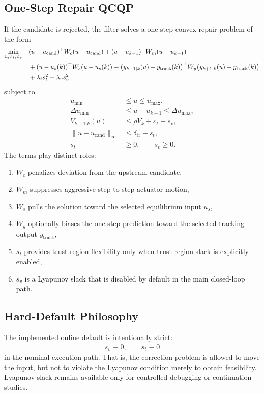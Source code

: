 \documentclass[11pt]{article}
\begin{document}
\subsection{One-Step Repair QCQP}
If the candidate is rejected, the filter solves a one-step convex repair problem of the form
\begin{align}
\min_{u,\,s_t,\,s_v}\quad
& (u-u_{\mathrm{cand}})^\top W_c (u-u_{\mathrm{cand}})
+ (u-u_{k-1})^\top W_m (u-u_{k-1}) \notag\\
& + (u-u_s(k))^\top W_s (u-u_s(k))
+ \big(y_{k+1|k}(u)-y_{\mathrm{track}}(k)\big)^\top W_y \big(y_{k+1|k}(u)-y_{\mathrm{track}}(k)\big) \notag\\
& + \lambda_t s_t^2 + \lambda_v s_v^2, \label{eq:qcqp_obj}
\end{align}
subject to
\begin{align}
u_{\min} &\le u \le u_{\max}, \label{eq:qcqp_ubounds}\\
\Delta u_{\min} &\le u-u_{k-1} \le \Delta u_{\max}, \label{eq:qcqp_dubounds}\\
V_{k+1|k}(u) &\le \rho V_k + \varepsilon_{\ell} + s_v, \label{eq:qcqp_lyap}\\
\lVert u-u_{\mathrm{cand}}\rVert_{\infty} &\le \delta_{\mathrm{tr}} + s_t, \label{eq:qcqp_trust}\\
s_t &\ge 0,\qquad s_v \ge 0. \label{eq:qcqp_slacks}
\end{align}
The terms play distinct roles:
\begin{enumerate}[leftmargin=*]
\item $W_c$ penalizes deviation from the upstream candidate,
\item $W_m$ suppresses aggressive step-to-step actuator motion,
\item $W_s$ pulls the solution toward the selected equilibrium input $u_s$,
\item $W_y$ optionally biases the one-step prediction toward the selected tracking output $y_{\mathrm{track}}$,
\item $s_t$ provides trust-region flexibility only when trust-region slack is explicitly enabled,
\item $s_v$ is a Lyapunov slack that is disabled by default in the main closed-loop path.
\end{enumerate}

\subsection{Hard-Default Philosophy}
The implemented online default is intentionally strict:
\begin{align}
s_v \equiv 0, \qquad s_t \equiv 0
\end{align}
in the nominal execution path. That is, the correction problem is allowed to move the input, but not to violate the Lyapunov condition merely to obtain feasibility. Lyapunov slack remains available only for controlled debugging or continuation studies.
\end{document}
